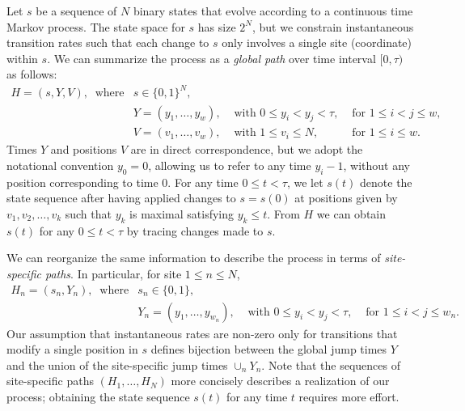 \documentclass[11pt]{article}
\newcommand\halfopen[2]{\ensuremath{[#1,#2)}}
\begin{document}
Let $s$ be a sequence of $N$ binary states that evolve according to a
continuous time Markov process. The state space for $s$ has size
$2^N$, but we constrain instantaneous transition rates such that each
change to $s$ only involves a single site (coordinate) within $s$. We
can summarize the process as a {\it global path} over time interval
$\halfopen{0}{\tau}$ as follows:
\begin{equation}\label{globalJumps}
\begin{array}{llll}
H = (s, Y, V), ~\mbox{ where} & s \in \{0,1\}^N,\\
                              & Y = (y_1, \ldots, y_w), & \mbox{ with } 0 \leq y_i < y_{j} < \tau, & \mbox{ for } 1\leq i < j \leq w,\\
                              & V = (v_1,\ldots, v_w), & \mbox{ with } 1\leq v_i\leq N, & \mbox{ for } 1\leq i \leq w.
\end{array}
\end{equation}
Times $Y$ and positions $V$ are in direct correspondence, but we adopt
the notational convention $y_0 = 0$, allowing us to refer to any time
$y_i-1$, without any position corresponding to time $0$.
For any time $0 \leq t < \tau$, we let $s(t)$ denote the state
sequence after having applied changes to $s = s(0)$ at positions given
by $v_1,v_2,\ldots,v_k$ such that $y_k$ is maximal satisfying $y_k
\leq t$. From $H$ we can obtain $s(t)$ for any $0\leq t < \tau$ by
tracing changes made to $s$.

We can reorganize the same information to describe the process in
terms of {\it site-specific paths}. In particular, for site $1\leq n
\leq N$,
\begin{equation}\label{localJumps}
\begin{array}{llll}
H_n = (s_n, Y_n), ~\mbox{ where} & s_n \in \{0,1\},\\
                                & Y_n = (y_1, \ldots, y_{w_n}), & \mbox{ with } 0\leq y_i < y_{j} < \tau, & \mbox{ for } 1\leq i < j \leq w_n.
\end{array}
\end{equation}
Our assumption that instantaneous rates are non-zero only for
transitions that modify a single position in $s$ defines bijection
between the global jump times $Y$ and the union of the site-specific
jump times $\cup_n Y_n$. Note that the sequences of site-specific
paths $(H_1,\ldots,H_N)$ more concisely describes a realization of our
process; obtaining the state sequence $s(t)$ for any time $t$ requires
more effort.
\end{document}
